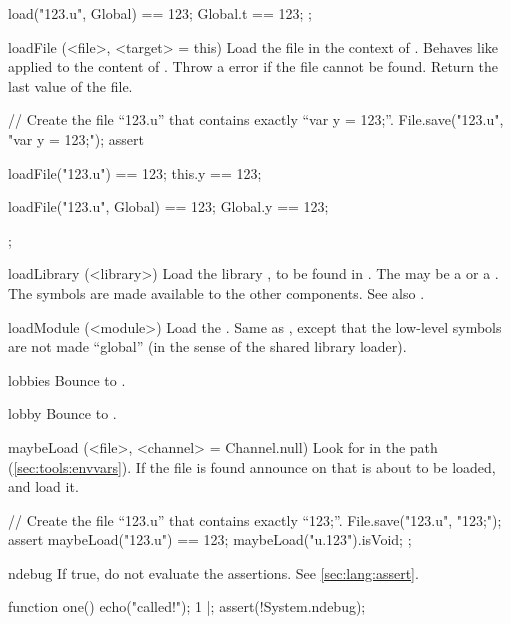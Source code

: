 \begin{urbiscriptapi}
\begin{urbiscript}
{  load("123.u", Global) == 123;
  Global.t == 123;
};
\end{urbiscript}


\item[loadFile](<file>, <target> = this)%
  Load the \us file  in the context of .  Behaves like
   applied to the content of .  Throw a
   error if the file cannot be found.
  Return the last value of the file.
\begin{urbiscript}
// Create the file ``123.u'' that contains exactly ``var y = 123;''.
File.save("123.u", "var y = 123;");
assert
{
  loadFile("123.u") == 123;
  this.y == 123;

  loadFile("123.u", Global) == 123;
  Global.y == 123;
};

\end{urbiscript}


\item[loadLibrary](<library>)%
  Load the library , to be found in
  .  The  may be a
   or a .  The \Cxx symbols are made
  available to the other \Cxx components.  See also .


\item[loadModule](<module>)%
  Load the \UObject {}.  Same as , except
  that the low-level \Cxx symbols are not made ``global'' (in the sense of
  the shared library loader).


\item[lobbies] Bounce to .


\item[lobby] Bounce to .


\item[maybeLoad](<file>, <channel> = Channel.null)%
  Look for  in the \urbi path (\autoref{sec:tools:envvars}).
  If the file is found announce on  that  is
  about to be loaded, and load it.

\begin{urbiscript}
// Create the file ``123.u'' that contains exactly ``123;''.
File.save("123.u", "123;");
assert
{
  maybeLoad("123.u") == 123;
  maybeLoad("u.123").isVoid;
};
\end{urbiscript}


\item[ndebug] If true, do not evaluate the assertions.  See
  \autoref{sec:lang:assert}.
\begin{urbiscript}
function one() { echo("called!"); 1 }|;
assert(!System.ndebug);


\end{urbiscript}
\end{urbiscriptapi}
